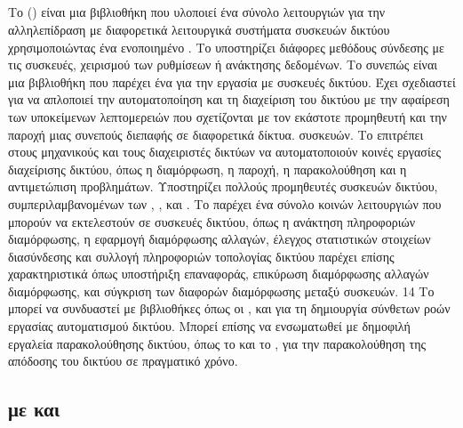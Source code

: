 \subsection{}
Το  () είναι μια βιβλιοθήκη  που υλοποιεί ένα σύνολο λειτουργιών για την αλληλεπίδραση με διαφορετικά λειτουργικά συστήματα συσκευών δικτύου χρησιμοποιώντας ένα ενοποιημένο .
Το  υποστηρίζει διάφορες μεθόδους σύνδεσης με τις συσκευές, χειρισμού των ρυθμίσεων ή ανάκτησης δεδομένων. Το  συνεπώς είναι μια βιβλιοθήκη  που παρέχει ένα 
 για την εργασία με συσκευές δικτύου. Έχει σχεδιαστεί για να απλοποιεί την
αυτοματοποίηση και τη διαχείριση του δικτύου με την αφαίρεση των υποκείμενων λεπτομερειών που σχετίζονται με τον εκάστοτε προμηθευτή και την παροχή μιας συνεπούς διεπαφής σε διαφορετικά δίκτυα. 
συσκευών.
Το  επιτρέπει στους μηχανικούς και τους διαχειριστές δικτύων να αυτοματοποιούν κοινές εργασίες διαχείρισης δικτύου, όπως η διαμόρφωση, η παροχή, η παρακολούθηση και η 
αντιμετώπιση προβλημάτων. Υποστηρίζει πολλούς προμηθευτές συσκευών δικτύου, συμπεριλαμβανομένων των , ,  και .
Το  παρέχει ένα σύνολο κοινών λειτουργιών που μπορούν να εκτελεστούν σε συσκευές δικτύου, όπως η ανάκτηση πληροφοριών διαμόρφωσης, η εφαρμογή διαμόρφωσης 
αλλαγών, έλεγχος στατιστικών στοιχείων διασύνδεσης και συλλογή πληροφοριών τοπολογίας δικτύου παρέχει επίσης χαρακτηριστικά όπως υποστήριξη επαναφοράς, επικύρωση διαμόρφωσης 
αλλαγών διαμόρφωσης, και σύγκριση των διαφορών διαμόρφωσης μεταξύ συσκευών.
14
Το  μπορεί να συνδυαστεί με βιβλιοθήκες  όπως οι ,  και  για τη δημιουργία σύνθετων ροών εργασίας αυτοματισμού δικτύου. Μπορεί επίσης να ενσωματωθεί 
με δημοφιλή εργαλεία παρακολούθησης δικτύου, όπως το  και το , για την παρακολούθηση της απόδοσης του δικτύου σε πραγματικό χρόνο.


\subsection{ με  και  }

